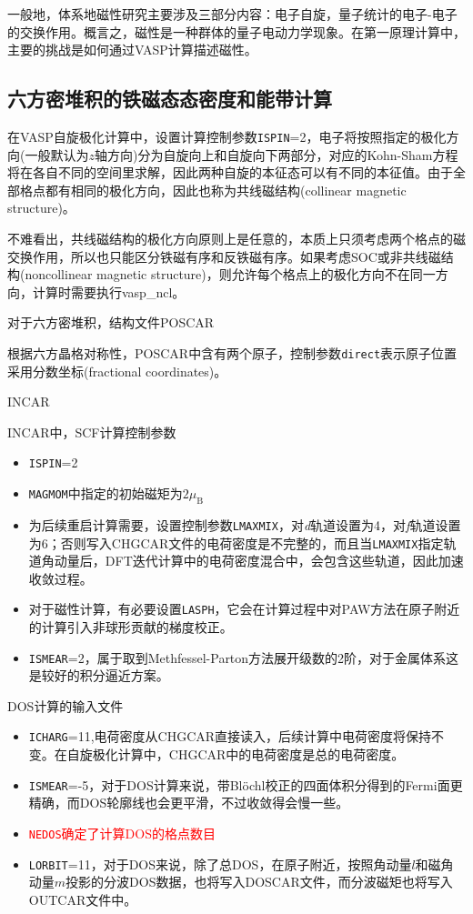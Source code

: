一般地，体系地磁性研究主要涉及三部分内容：电子自旋，量子统计的电子-电子的交换作用。概言之，磁性是一种群体的量子电动力学现象。在第一原理计算中，主要的挑战是如何通过\textrm{VASP}计算描述磁性。
\subsection{六方密堆积的铁磁态态密度和能带计算}
在\textrm{VASP}自旋极化计算中，设置计算控制参数\texttt{ISPIN}=2，电子将按照指定的极化方向(一般默认为$z$轴方向)分为自旋向上和自旋向下两部分，对应的\textrm{Kohn-Sham}方程将在各自不同的空间里求解，因此两种自旋的本征态可以有不同的本征值。由于全部格点都有相同的极化方向，因此也称为共线磁结构\textrm{(collinear magnetic structure)}。

不难看出，共线磁结构的极化方向原则上是任意的，本质上只须考虑两个格点的磁交换作用，所以也只能区分铁磁有序和反铁磁有序。如果考虑\textrm{SOC}或非共线磁结构\textrm{(noncollinear magnetic structure)}，则允许每个格点上的极化方向不在同一方向，计算时需要执行\textrm{vasp\_ncl}。

对于六方密堆积，结构文件\textrm{POSCAR}

根据六方晶格对称性，\textrm{POSCAR}中含有两个原子，控制参数\texttt{direct}表示原子位置采用分数坐标\textrm{(fractional coordinates)}。

\textrm{INCAR}

\textrm{INCAR}中，\textrm{SCF}计算控制参数
\begin{itemize}
	\item \texttt{ISPIN}=2
	\item \texttt{MAGMOM}中指定的初始磁矩为$2\mu_{\mathrm{B}}$
	\item 为后续重启计算需要，设置控制参数\texttt{LMAXMIX}，对\textit{d}轨道设置为4，对\textit{f}轨道设置为6；否则写入\textrm{CHGCAR}文件的电荷密度是不完整的，而且当\texttt{LMAXMIX}指定轨道角动量后，\textrm{DFT}迭代计算中的电荷密度混合中，会包含这些轨道，因此加速收敛过程。
	\item 对于磁性计算，有必要设置\texttt{LASPH}，它会在计算过程中对\textrm{PAW}方法在原子附近的计算引入非球形贡献的梯度校正。
	\item \texttt{ISMEAR}=2，属于取到\textrm{Methfessel-Parton}方法展开级数的2阶，对于金属体系这是较好的积分逼近方案。
\end{itemize}
\textrm{DOS}计算的输入文件
\begin{itemize}
	\item \texttt{ICHARG}=11,电荷密度从\textrm{CHGCAR}直接读入，后续计算中电荷密度将保持不变。在自旋极化计算中，\textrm{CHGCAR}中的电荷密度是总的电荷密度。
	\item \texttt{ISMEAR}=-5，对于\textrm{DOS}计算来说，带\textrm{Bl\"ochl}校正的四面体积分得到的\textrm{Fermi}面更精确，而\textrm{DOS}轮廓线也会更平滑，不过收敛得会慢一些。
	\item \textcolor{red}{\texttt{NEDOS}确定了计算\textrm{DOS}的格点数目}
	\item \texttt{LORBIT}=11，对于\textrm{DOS}来说，除了总\textrm{DOS}，在原子附近，按照角动量$l$和磁角动量$m$投影的分波\textrm{DOS}数据，也将写入\textrm{DOSCAR}文件，而分波磁矩也将写入\textrm{OUTCAR}文件中。
\end{itemize}

